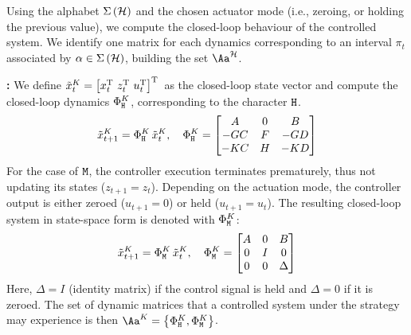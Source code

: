 Using the alphabet $\Sigma\left(\mathcal{H}\right)$ and the chosen actuator mode (i.e., zeroing, or holding the previous value), we compute the closed-loop behaviour of the controlled system.
We identify one matrix for each dynamics corresponding to an interval $\pi_t$ associated by $\alpha \in \Sigma\left( \mathcal{H} \right)$, building the set $\Aa^\strat$.

\textbf{\tK{}: }%
%
We define $\tilde x_t^{K} = \left[ x_t^{\mathrm{\small{T}}}{}\,\, z_t^{\mathrm{\small{T}}}{}\,\, u_t^{\mathrm{\small{T}}}{} \right]^{\mathrm{\small{T}}}{}$ as the closed-loop state vector and compute the closed-loop dynamics $\Phi{}^{K}_{\texttt{H}}$, corresponding to the character $\texttt{H}$.
\begin{equation*}
    \tilde x_{t+1}^{K} = \Phi{}^{K}_{\texttt{H}}\,\tilde x_t^{K}, \quad
    \Phi{}^{K}_{\texttt{H}} = \begin{bmatrix}
        A       & 0    & B       \\
        -GC   & F  & -GD   \\
        -KC   & H  & -KD   \\
    \end{bmatrix}
\end{equation*}
%
For the case of $\texttt{M}$, the controller execution terminates prematurely, thus not updating its states ($z_{t+1} = z_t$).
Depending on the actuation mode, the controller output is either zeroed ($u_{t+1} = 0$) or held ($u_{t+1} = u_t$).
The resulting closed-loop system in state-space form is denoted with $\Phi{}^{K}_{\texttt{M}}$:
\begin{equation*}
    \tilde x_{t+1}^{K} = \Phi{}^{K}_{\texttt{M}}\,\tilde x_t^{K}, \quad
    \Phi{}^{K}_{\texttt{M}} = \begin{bmatrix}
        A & 0  & B \\
        0   & I  & 0   \\
        0   & 0  & \Delta
    \end{bmatrix}
\end{equation*}
Here, $\Delta = I$ (identity matrix) if the control signal is held and $\Delta = 0$ if it is zeroed.
The set of dynamic matrices that a controlled system under the \tK{} strategy may experience is then $\Aa^{K}=\left\{\clmat{}^{K}_{\cH},\clmat{}^{K}_{\cM}\right\}$.

